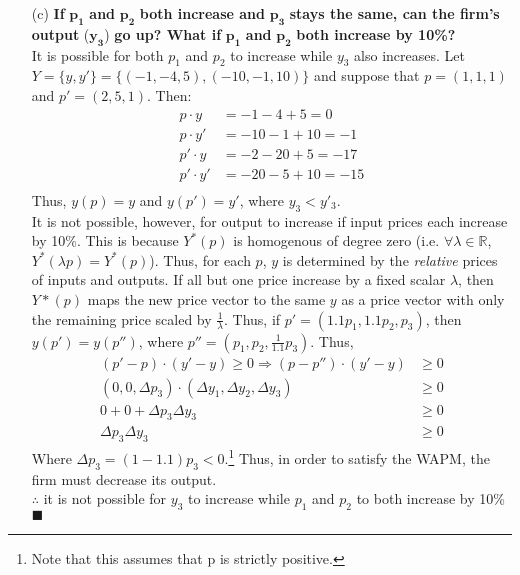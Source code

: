 \documentclass{article}
\newcommand{\R}{\mathbb{R}}
\begin{document}
\begin{itemize}
	\item[(c)]\textbf{If} $\mathbf{p_1}$ \textbf{and} $\mathbf{p_2}$ \textbf{both increase and} $\mathbf{p_3}$ \textbf{stays the same, can the firm's output} ($\mathbf{y_3}$) \textbf{go up? What if} $\mathbf{p_1}$ \textbf{and} $\mathbf{p_2}$ \textbf{both increase by 10\%?}
		\smallskip \\
		It is possible for both $p_1$ and $p_2$ to increase while $y_3$ also increases. Let $Y=\{y,y'\}=\{(-1,-4,5),(-10,-1,10)\}$ and suppose that $p=(1,1,1)$ and $p'=(2,5,1)$. Then:
		\begin{align*}
			p\cdot y		&= -1-4+5 		= 0		\\
			p\cdot y' 	&= -10-1+10 	= -1	\\
			p'\cdot y 	&= -2-20+5		= -17	\\
			p'\cdot y'	&= -20-5+10		= -15	\\
		\end{align*}
		Thus, $y(p)=y$ and $y(p')=y'$, where $y_3<y'_3$.
		\medskip \\
		It is not possible, however, for output to increase if input prices each increase by 10\%. This is because $Y^*(p)$ is homogenous of degree zero (i.e. $\forall\lambda\in\R$, $Y^*(\lambda p)=Y^*(p)$). Thus, for each $p$, $y$ is determined by the \textit{relative} prices of inputs and outputs. If all but one price increase by a fixed scalar $\lambda$, then $Y*(p)$ maps the new price vector to the same $y$ as a price vector with only the remaining price scaled by $\frac{1}{\lambda}$. Thus, if $p'=(1.1p_1,1.1p_2,p_3)$, then $y(p')=y(p'')$, where $p''=\left(p_1,p_2,\frac{1}{1.1}p_3\right)$. Thus, 
		\begin{align*}
			(p'-p)\cdot(y'-y) \geq 0 \Rightarrow (p-p'')\cdot(y'-y) 	&\geq 0 \\
			(0,0,\Delta p_3)\cdot(\Delta y_1,\Delta y_2,\Delta y_3) 	&\geq 0 \\
			0 + 0 + \Delta p_3 \Delta y_3 							&\geq 0 \\
			\Delta p_3 \Delta y_3 									&\geq 0 
		\end{align*}
		Where $\Delta p_3 = (1-1.1)p_3<0$.\footnote{Note that this assumes that p is strictly positive.} Thus, in order to satisfy the WAPM, the firm must decrease its output.
		\smallskip \\
		$\therefore$ it is not possible for $y_3$ to increase while $p_1$ and $p_2$ to both increase by 10\%  $\blacksquare$
		
\end{itemize}	
\end{document}
